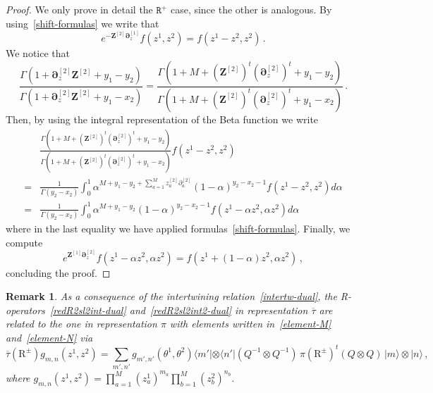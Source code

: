 \documentclass[11pt]{article}
\numberwithin{equation}{section}
\newtheorem{remark}[theorem]{Remark}
\newcommand{\M}{M}
\newcommand{\abrOSCR}{\mathrm{R}}
\newcommand{\ecdR}{\mathtt{R}}
\newcommand{\hidden}{\theta}
\newcommand{\heat}{z}
\newcommand{\Heat}{Z}
\newcommand{\dualrep}{\overline{\tau}}
\begin{document}
\begin{proof} We only prove in detail the $\ecdR^{+}$ case, since the other is analogous. By using~\eqref{shift-formulas} we write that 
    \begin{equation}
        e^{-\bm{\Heat}^{[2]}\bm{\partial}^{[1]}_{\heat}}f(\heat^{1},\heat^{2})=f(\heat^{1}-\heat^{2},\heat^{2})\,.
    \end{equation}
    We notice that
    \begin{equation}
    \frac{\Gamma(1+\bm{\partial}_{\heat}^{[2]}\bm{\Heat}^{[2]}+y_{1}-y_{2})}{\Gamma(1+\bm{\partial}_{\heat}^{[2]}\bm{\Heat}^{[2]}+y_{1}-x_{2})}=\frac{\Gamma(1+\M+(\bm{\Heat}^{[2]})^{t}(\bm{\partial}_{\heat}^{[2]})^{t}+y_{1}-y_{2})}{\Gamma(1+\M+(\bm{\Heat}^{[2]})^{t}(\bm{\partial}_{\heat}^{[2]})^{t}+y_{1}-x_{2})}\,.
    \end{equation}
    Then, by using the integral representation of the Beta function we write 
    \begin{equation}
        \begin{split}
         &\frac{\Gamma(1+\M+(\bm{\Heat}^{[2]})^{t}(\bm{\partial}_{\heat}^{[2]})^{t}+y_{1}-y_{2})}{\Gamma(1+\M+(\bm{\Heat}^{[2]})^{t}(\bm{\partial}_{\heat}^{[2]})^{t}+y_{1}-x_{2})}f(\heat^{1}-\heat^{2},\heat^{2})
         \\=&
         \frac{1}{\Gamma(y_{2}-x_{2})}\int_{0}^{1}\alpha^{\M+y_{1}-y_{2}+\sum_{a=1}^{\M}\heat_{a}^{[2]}\partial_{a}^{[2]}}(1-\alpha)^{y_{2}-x_{2}-1}f(\heat^{1}-\heat^{2},\heat^{2})d\alpha
         \\=&
          \frac{1}{\Gamma(y_{2}-x_{2})}\int_{0}^{1}\alpha^{\M+y_{1}-y_{2}}(1-\alpha)^{y_{2}-x_{2}-1}f(\heat^{1}-\alpha \heat^{2},\alpha \heat^{2})d\alpha
        \end{split}
    \end{equation}
    where in the last equality we have applied formulas~\eqref{shift-formulas}. Finally, we compute 
    \begin{equation}
        e^{\bm{\Heat}^{[1]}\bm{\partial}_{\heat}^{[2]}}f(\heat^{1}-\alpha \heat^{2},\alpha \heat^{2})=f(\heat^{1}+(1-\alpha)\heat^{2},\alpha \heat^{2})\,,
    \end{equation}
    concluding the proof. 
\end{proof}

\begin{remark}\label{InterRe-dual}
As a consequence of the intertwining relation~\eqref{intertw-dual},
 the R-operators~\eqref{redR2sl2int-dual} and~\eqref{redR2sl2int2-dual} in representation $\dualrep$  are related  to  the one in representation $\pi$ with elements written in~\eqref{element-M} and~\eqref{element-N} via
 \begin{equation}
  \dualrep (\abrOSCR ^\pm)g_{m,n}(\heat^{1},\heat^{2})=\sum_{m',n'} g_{m',n'}(\hidden^{1},\hidden^{2})\langle m'|\otimes \langle n'|\left(Q^{-1}\otimes Q^{-1}\right)\,\pi(\abrOSCR^\pm)^{t}\left(Q\otimes Q\right) \,|m\rangle \otimes |n\rangle\,,
 \end{equation}
where $g_{m,n}(\heat^{1},\heat^{2})=\prod_{a=1}^{\M}(\heat_a^{1})^{m_a}\prod_{b=1}^{\M}(\heat_{b}^{2})^{n_{b}}$.

 

\end{remark}
\end{document}
